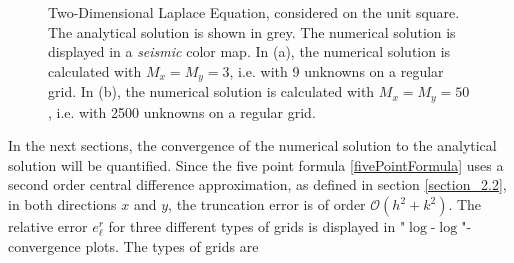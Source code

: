 \begin{figure}
\centering
{}\hspace{0mm}
\hspace{0mm}
\caption{Two-Dimensional Laplace Equation, considered on the unit square. The analytical solution is shown in grey. The numerical solution is displayed in a \textit{seismic} color map. In (a), the numerical solution is calculated with $M_x = M_y = 3$, i.e. with 9 unknowns on a regular grid. In (b), the numerical solution is calculated with $M_x = M_y = 50$, i.e. with 2500 unknowns on a regular grid.}
\end{figure}
\newpage
In the next sections, the convergence of the numerical solution to the analytical solution will be quantified. Since the five point formula \eqref{fivePointFormula} uses a second order central difference approximation, as defined in section \ref{section_2.2}, in both directions $x$ and $y$, the truncation error is of order $\mathcal{O}(h^2 + k^2)$. The relative error $e^r_{\ell}$ for three different types of grids is displayed in "$\log$-$\log$"-convergence plots. The types of grids are 


